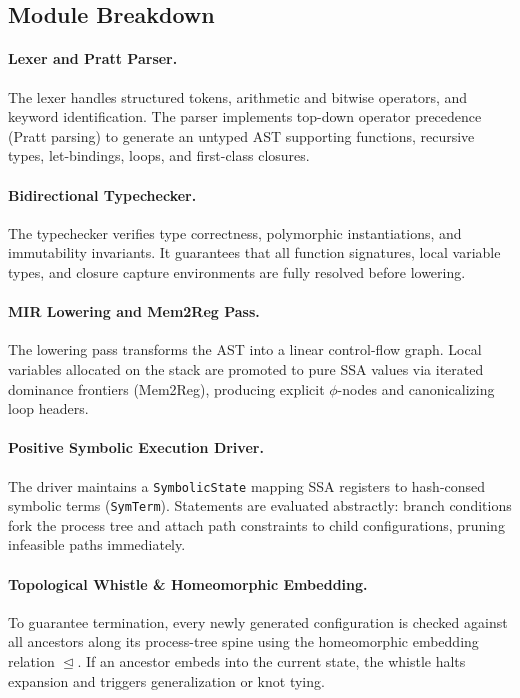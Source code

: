 \subsection{Module Breakdown}
\paragraph{Lexer and Pratt Parser.}
The lexer handles structured tokens, arithmetic and bitwise operators, and keyword identification. The parser implements top-down operator precedence (Pratt parsing) to generate an untyped AST supporting functions, recursive types, let-bindings, loops, and first-class closures.

\paragraph{Bidirectional Typechecker.}
The typechecker verifies type correctness, polymorphic instantiations, and immutability invariants. It guarantees that all function signatures, local variable types, and closure capture environments are fully resolved before lowering.

\paragraph{MIR Lowering and Mem2Reg Pass.}
The lowering pass transforms the AST into a linear control-flow graph. Local variables allocated on the stack are promoted to pure SSA values via iterated dominance frontiers (Mem2Reg), producing explicit $\phi$-nodes and canonicalizing loop headers.

\paragraph{Positive Symbolic Execution Driver.}
The driver maintains a \texttt{SymbolicState} mapping SSA registers to hash-consed symbolic terms (\texttt{SymTerm}). Statements are evaluated abstractly: branch conditions fork the process tree and attach path constraints to child configurations, pruning infeasible paths immediately.

\paragraph{Topological Whistle \& Homeomorphic Embedding.}
To guarantee termination, every newly generated configuration is checked against all ancestors along its process-tree spine using the homeomorphic embedding relation $\trianglelefteq$. If an ancestor embeds into the current state, the whistle halts expansion and triggers generalization or knot tying.

